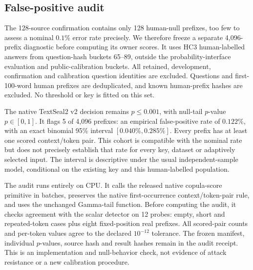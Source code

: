 \subsection{False-positive audit}
\label{sec:human_null_audit}
The 128-source confirmation contains only 128 human-null prefixes, too few to assess a nominal $0.1\%$ error rate precisely. We therefore freeze a separate 4,096-prefix diagnostic before computing its owner scores. It uses HC3 human-labelled answers from question-hash buckets 65--89, outside the probability-interface evaluation and public-calibration buckets. All retained, development, confirmation and calibration question identities are excluded. Questions and first-100-word human prefixes are deduplicated, and known human-prefix hashes are excluded. No threshold or key is fitted on this set.

The native TextSeal2 v2 decision remains $p\leq0.001$, with null-tail $p$-value $p\in[0,1]$. It flags 5 of 4,096 prefixes: an empirical false-positive rate of $0.122\%$, with an exact binomial 95\% interval $[0.040\%,0.285\%]$. Every prefix has at least one scored context/token pair. This cohort is compatible with the nominal rate but does not precisely establish that rate for every key, dataset or adaptively selected input. The interval is descriptive under the usual independent-sample model, conditional on the existing key and this human-labelled population.

The audit runs entirely on CPU. It calls the released native copula-score primitive in batches, preserves the native first-occurrence context/token-pair rule, and uses the unchanged Gamma-tail function. Before computing the audit, it checks agreement with the scalar detector on 12 probes: empty, short and repeated-token cases plus eight fixed-position real prefixes. All scored-pair counts and per-token values agree to the declared $10^{-12}$ tolerance. The frozen manifest, individual $p$-values, source hash and result hashes remain in the audit receipt. This is an implementation and null-behavior check, not evidence of attack resistance or a new calibration procedure.
